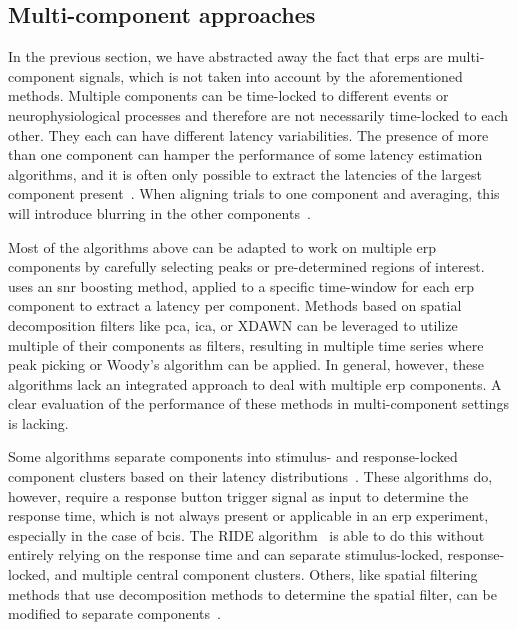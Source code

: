 \subsection{Multi-component approaches}
\label{sec:wcble/literature/multi-comp}
In the previous section, we have abstracted away the fact that \acp{erp} are
multi-component signals, which is not taken into account by the aforementioned
methods.
Multiple components can be time-locked to different events or neurophysiological
processes and therefore are not necessarily time-locked to each other. They
each can have different latency variabilities.
The presence of more than one component can hamper the
performance of some latency estimation algorithms, and it is often only possible to extract the latencies of the largest component present~\cite{Ouyang2017}. When aligning trials
to one component and averaging, this will introduce blurring in the other
components~\cite{Ouyang2020}.

Most of the algorithms above can be adapted to work on multiple \ac{erp} components
by carefully selecting peaks or pre-determined regions of interest.
\textcite{Hardiansyah2020} uses an \ac{snr} boosting method, applied to a specific
time-window for each \ac{erp} component to extract a latency per component.
Methods based on spatial decomposition filters like \ac{pca}, \ac{ica}, or XDAWN can be leveraged
to utilize multiple of their components as filters, resulting in multiple time
series where peak picking or Woody's algorithm can be applied. In general,
however, these algorithms lack an integrated approach to deal with multiple
\ac{erp} components. A clear evaluation of the performance of these
methods in multi-component settings is lacking.

Some algorithms separate components into stimulus- and response-locked component clusters based on their
latency distributions~\cite{Jung2001, Takeda2008, Zhang1998, Yin2009}.
These algorithms do, however, require a response
button trigger signal as input to determine the response time, which is
not always present or applicable in an \ac{erp} experiment, especially in
the case of \acp{bci}.
The RIDE algorithm~\cite{Ouyang2011, Ouyang2015, Wang2015, Ouyang2016, Ouyang2020}
is able to do this without entirely relying on the response time and can
separate stimulus-locked, response-locked, and multiple central component clusters.
Others, like spatial filtering methods that use decomposition methods to
determine the spatial filter, can be modified to separate
components~\cite{Ouyang2017}.

